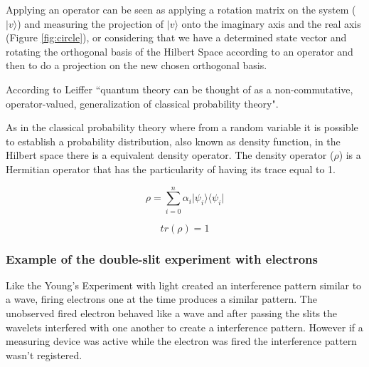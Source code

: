 Applying an operator can be seen as applying a rotation matrix on the system ($\vert v \rangle$) and measuring the projection of $\vert v \rangle$ onto the imaginary axis and the real axis (Figure \ref{fig:circle}), or considering that we have a determined state vector and rotating the orthogonal basis of the Hilbert Space according to an operator and then to do a projection on the new chosen orthogonal basis.

According to Leiffer\cite{Leifer2008} ``quantum theory can be thought of as a non-commutative, operator-valued, generalization of classical probability theory". 


As in the classical probability theory where from a random variable it is possible to establish a probability distribution, also known as density function, in the Hilbert space there is a equivalent density operator.
The density operator ($\rho$) is a Hermitian operator that has the particularity of having its trace equal to 1\cite{VanRijsbergen2004}.

\begin{equation}
\label{eq_trace1}
\rho = \sum_{i=0}^{n} \alpha_{i} \vert\psi_{i}\rangle\langle\psi_{i}\vert
\end{equation} 

\begin{equation}
\label{eq_trace1}
tr( \rho ) = 1
\end{equation}

\subsubsection{Example of the double-slit experiment with electrons}
 Like the Young's Experiment with light created an interference pattern similar to a wave, firing electrons one at the time produces a similar pattern. The unobserved fired electron behaved like a wave and after passing the slits the wavelets interfered with one another to create a interference pattern. However if a measuring device was active while the electron was fired the interference pattern wasn't registered. 

